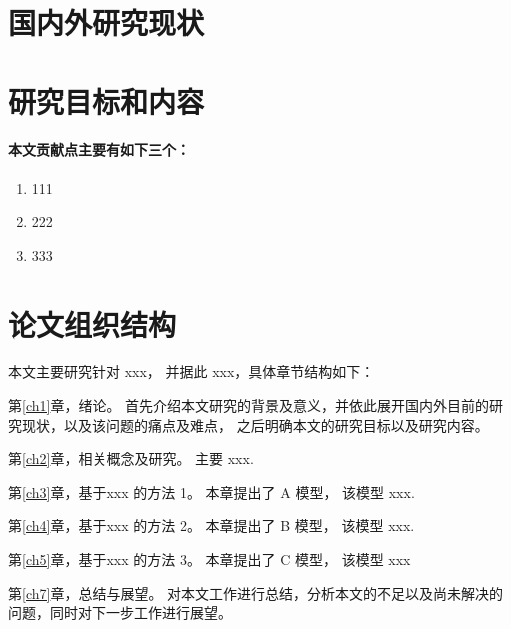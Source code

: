\section{国内外研究现状}
\section{研究目标和内容}
\paragraph{本文贡献点主要有如下三个：}

\begin{enumerate}
    \item 111
    \item 222
    \item 333
\end{enumerate}


\section{论文组织结构}
本文主要研究针对 xxx，
并据此 xxx，具体章节结构如下：

第\ref{ch1}章，绪论。
首先介绍本文研究的背景及意义，并依此展开国内外目前的研究现状，以及该问题的痛点及难点，
之后明确本文的研究目标以及研究内容。

第\ref{ch2}章，相关概念及研究。
主要 xxx.

第\ref{ch3}章，基于xxx 的方法 1。
本章提出了 A 模型，
该模型 xxx.

第\ref{ch4}章，基于xxx 的方法 2。
本章提出了 B 模型，
该模型 xxx.

第\ref{ch5}章，基于xxx 的方法 3。
本章提出了 C 模型，
该模型 xxx

第\ref{ch7}章，总结与展望。
对本文工作进行总结，分析本文的不足以及尚未解决的问题，同时对下一步工作进行展望。
